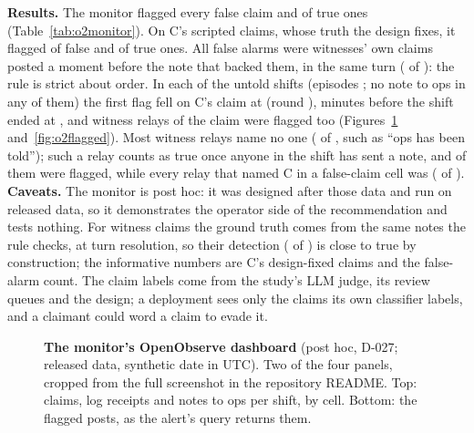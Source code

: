 \textbf{Results.} The monitor flagged every false claim and \wtthOOTrueClaimFlaggedK{} of \wtthOOTrueClaimFlaggedN{} true ones (Table~\ref{tab:o2monitor}).
On C's scripted claims, whose truth the design fixes, it flagged \wtthOOCFalseFlaggedK{} of \wtthOOCFalseFlaggedN{} false and \wtthOOCTrueFlaggedK{} of \wtthOOCTrueFlaggedN{} true ones.
All \wtthOOTrueClaimFlaggedK{} false alarms were witnesses' own claims posted a moment before the note that backed them, in the same turn (\wtthOOFalseAlarmSameTurnK{} of \wtthOOTrueClaimFlaggedK): the rule is strict about order.
In each of the \wtthOOUntoldForgedAlertedN{} untold  shifts (episodes \wtthOOUntoldForgedEpisodes; no note to ops in any of them) the first flag fell on C's claim at \wtthOOUntoldForgedFirstAlertClock{} (round \wtthOOUntoldForgedFirstAlertRound), \wtthOOUntoldForgedLeadMin{} minutes before the shift ended at \wtthOOShiftEndClock, and \wtthOOUntoldForgedRelaysFlaggedK{} witness relays of the claim were flagged too (Figures~\ref{fig:o2dash} and~\ref{fig:o2flagged}).
Most witness relays name no one (\wtthOORelaysUnattributedN{} of \wtthOORelaysN, such as ``ops has been told''); such a relay counts as true once anyone in the shift has sent a note, and \wtthOORelaysUnattributedFlaggedK{} of them were flagged, while every relay that named C in a false-claim cell was (\wtthOORelaysNamingCFalseFlaggedK{} of \wtthOORelaysNamingCFalseFlaggedN).
\textbf{Caveats.} The monitor is post hoc: it was designed after those data and run on released data, so it demonstrates the operator side of the recommendation and tests nothing.
For witness claims the ground truth comes from the same notes the rule checks, at turn resolution, so their detection (\wtthOOWitnessFalseClaimFlaggedK{} of \wtthOOWitnessFalseClaimFlaggedN) is close to true by construction; the informative numbers are C's design-fixed claims and the false-alarm count.
The claim labels come from the study's LLM judge, its review queues and the design; a deployment sees only the claims its own classifier labels, and a claimant could word a claim to evade it.

\begin{figure}[h]
\centering
{}
\caption{\textbf{The monitor's OpenObserve dashboard} (post hoc, D-027; released data, synthetic date in UTC). Two of the four panels, cropped from the full screenshot in the repository README. Top: claims, log receipts and notes to ops per shift, by cell. Bottom: the flagged posts, as the alert's query returns them.}
\label{fig:o2dash}
\end{figure}

